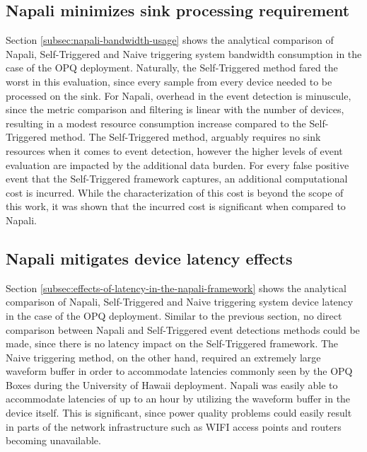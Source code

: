 \subsection{Napali minimizes sink processing requirement}\label{subsec:conc:napali-minimizes-sink-processing-requirement}
Section \ref{subsec:napali-bandwidth-usage} shows the analytical comparison of Napali, Self-Triggered and Naive triggering system bandwidth consumption in the case of the OPQ deployment.
Naturally, the Self-Triggered method fared the worst in this evaluation, since every sample from every device needed to be processed on the sink.
For Napali, overhead in the event detection is minuscule, since the metric comparison and filtering is linear with the number of devices,
resulting in a modest resource consumption increase compared to the Self-Triggered method.
The Self-Triggered method, arguably requires no sink resources when it comes to event detection, however the higher levels of event evaluation are impacted by the additional data burden.
For every false positive event that the Self-Triggered framework captures, an additional computational cost is incurred.
While the characterization of this cost is beyond the scope of this work, it was shown that the incurred cost is significant when compared to Napali.

\subsection{Napali mitigates device latency effects}\label{subsec:conc:napali-mitigates-device-latency-effects}
Section \ref{subsec:effects-of-latency-in-the-napali-framework} shows the analytical comparison of Napali, Self-Triggered and Naive triggering system device latency in the case of the OPQ deployment.
Similar to the previous section, no direct comparison between Napali and Self-Triggered event detections methods could be made, since there is no latency impact on the Self-Triggered framework.
The Naive triggering method, on the other hand, required an extremely large waveform buffer in order to accommodate latencies commonly seen by the OPQ Boxes during the University of Hawaii deployment.
Napali was easily able to accommodate latencies of up to an hour by utilizing the waveform buffer in the device itself.
This is significant, since power quality problems could easily result in parts of the network infrastructure such as WIFI access points and routers becoming unavailable.

